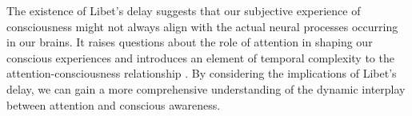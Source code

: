 \documentclass[10pt]{article}
\begin{document}
\begin{sloppypar}
  The existence of Libet’s delay suggests that our subjective experience of consciousness might not always align with the actual neural processes occurring in our brains. It raises questions about the role of attention in shaping our conscious experiences and introduces an element of temporal complexity to the attention-consciousness relationship \citep{noah_recent_2020}. By considering the implications of Libet’s delay, we can gain a more comprehensive understanding of the dynamic interplay between attention and conscious awareness.

  \pagebreak
  \singlespacing %
  
  

\end{sloppypar}
\end{document}
